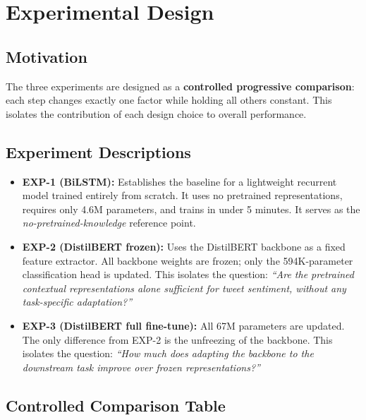 \section{Experimental Design}

\subsection{Motivation}

The three experiments are designed as a \textbf{controlled progressive comparison}: each step changes exactly one factor while holding all others constant. This isolates the contribution of each design choice to overall performance.

\subsection{Experiment Descriptions}

\begin{itemize}
    \item \textbf{EXP-1 (BiLSTM):} Establishes the baseline for a lightweight recurrent model trained entirely from scratch. It uses no pretrained representations, requires only 4.6M parameters, and trains in under 5 minutes. It serves as the \textit{no-pretrained-knowledge} reference point.

    \item \textbf{EXP-2 (DistilBERT frozen):} Uses the DistilBERT backbone as a fixed feature extractor. All backbone weights are frozen; only the 594K-parameter classification head is updated. This isolates the question: \textit{``Are the pretrained contextual representations alone sufficient for tweet sentiment, without any task-specific adaptation?''}

    \item \textbf{EXP-3 (DistilBERT full fine-tune):} All 67M parameters are updated. The only difference from EXP-2 is the unfreezing of the backbone. This isolates the question: \textit{``How much does adapting the backbone to the downstream task improve over frozen representations?''}
\end{itemize}

\subsection{Controlled Comparison Table}

